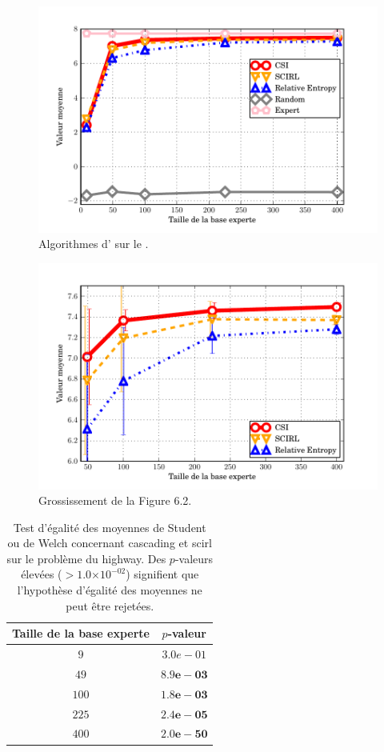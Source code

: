 \documentclass[frenchb,a4paper,justified,notoc]{tufte-book}
\providecommand{\e}[1]{\ensuremath{\times 10^{#1}}}
\begin{document}
\begin{figure}
\centering
\includegraphics[width=\textwidth]{Figures/highway_csi1.pdf}
\caption{Algorithmes d' sur le .}
\label{fig:csihighway1}
\end{figure}
\begin{figure}
\centering
\includegraphics[width=\textwidth]{Figures/highway_csi2.pdf}
\caption{Grossissement de la Figure 6.2.}%
\label{fig:csihighway2}
\end{figure}

\begin{table}
\centering
\begin{tabular}{cc}
\toprule
Taille de la base experte & $p$-valeur\\
\midrule
      $  9$ & $3.0e-01$\\
      $ 49$ & $\mathbf{8.9e-03}$\\
      $100$ & $\mathbf{1.8e-03}$\\
      $225$ & $\mathbf{2.4e-05}$\\
      $400$ & $\mathbf{2.0e-50}$\\
\bottomrule
\end{tabular}
\caption[Départager  et  sur le ]{Test d'égalité des moyennes de Student ou de Welch concernant \gls{cascading} et \gls{scirl} sur le problème du \gls{highway}. Des $p$-valeurs élevées ($>1.0\e{-02}$) signifient que l'hypothèse d'égalité des moyennes ne peut être rejetées.}
\label{tab:highway}
\end{table}
\end{document}
